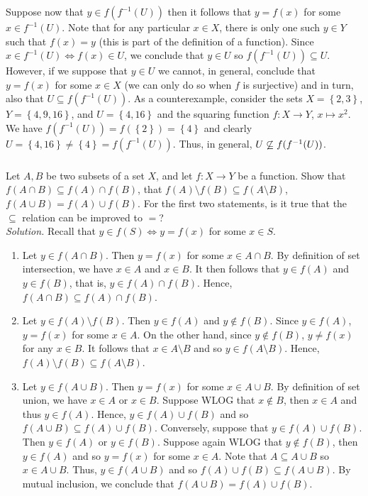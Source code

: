 \documentclass{amsart}
\theoremstyle{definition}
\newcommand{\set}[1]{\left\{#1\right\}}
\begin{document}
Suppose now that $y\in f(f^{-1}(U))$ then it follows that $y=f(x)$ for some $x\in f^{-1}(U)$. Note that for any particular $x\in X$, there is only one such $y\in Y$ such that $f(x)=y$ (this is part of the definition of a function). Since $x\in f^{-1}(U) \iff f(x)\in U$, we conclude that $y\in U$ so $f(f^{-1}(U))\subseteq U$. However, if we suppose that $y\in U$ we cannot, in general, conclude that $y=f(x)$ for some $x\in X$ (we can only do so when $f$ is surjective) and in turn, also that $U\subseteq f(f^{-1}(U))$. As a counterexample, consider the sets $X=\set{2,3}$, $Y=\set{4,9,16}$, and $U=\set{4,16}$ and the squaring function $f:X\to Y$, $x\mapsto x^2$. We have $f(f^{-1}(U))=f(\set{2})=\set{4}$ and clearly $U=\set{4,16}\neq\set{4}=f(f^{-1}(U))$. Thus, in general, $U\centernot\subseteq f(f^{-1}(U))$. \\


\subsubsection{} Let $A,B$ be two subsets of a set $X$, and let $f:X\to Y$ be a function. Show that $f(A\cap B)\subseteq f(A)\cap f(B)$, that $f(A)\setminus f(B)\subseteq f(A\setminus B)$, $f(A\cup B)=f(A)\cup f(B)$. For the first two statements, is it true that the $\subseteq$ relation can be improved to $=$? \\

\textit{Solution.} Recall that $y\in f(S) \iff y=f(x)$ for some $x\in S$.
\begin{enumerate}
\item Let $y\in f(A\cap B)$. Then $y=f(x)$ for some $x\in A\cap B$. By definition of set intersection, we have $x\in A$ and $x\in B$. It then follows that $y\in f(A)$ and $y\in f(B)$, that is, $y\in f(A)\cap f(B)$. Hence, $f(A\cap B)\subseteq f(A)\cap f(B)$. \\

\item Let $y\in f(A)\setminus f(B)$. Then $y\in f(A)$ and $y\notin f(B)$. Since $y\in f(A)$, $y=f(x)$ for some $x\in A$. On the other hand, since $y\notin f(B)$, $y\neq f(x)$ for any $x\in B$. It follows that $x\in A\setminus B$ and so $y\in f(A\setminus B)$. Hence, $f(A)\setminus f(B)\subseteq f(A\setminus B)$. \\

\item Let $y\in f(A\cup B)$. Then $y=f(x)$ for some $x\in A\cup B$. By definition of set union, we have $x\in A$ or $x\in B$. Suppose WLOG that $x\notin B$, then $x\in A$ and thus $y\in f(A)$. Hence, $y\in f(A)\cup f(B)$ and so $f(A\cup B)\subseteq f(A)\cup f(B)$. Conversely, suppose that $y\in f(A)\cup f(B)$. Then $y\in f(A)$ or $y\in f(B)$. Suppose again WLOG that $y\notin f(B)$, then $y\in f(A)$ and so $y=f(x)$ for some $x\in A$. Note that $A\subseteq A\cup B$ so $x\in A\cup B$. Thus, $y\in f(A\cup B)$ and so $f(A)\cup f(B)\subseteq f(A\cup B)$. By mutual inclusion, we conclude that $f(A\cup B)=f(A)\cup f(B)$. \\
\end{enumerate}
\end{document}
